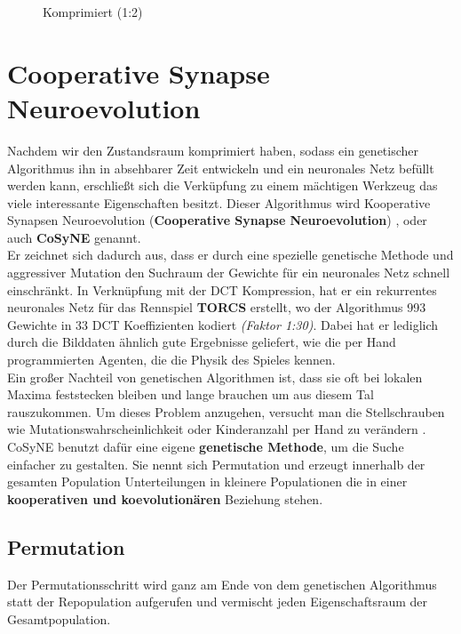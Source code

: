 \begin{multicols}{2}
\begin{figure}[H]
\begin{center}
                        \caption{Komprimiert (1:2)}\label{fig:dct-after}
                    \end{center}
                \end{figure}
            \end{multicols}

\newpage

    \section{Cooperative Synapse Neuroevolution} \label{cosyne-definition}
        Nachdem wir den Zustandsraum komprimiert haben, sodass ein genetischer Algorithmus ihn in absehbarer Zeit entwickeln und ein neuronales Netz befüllt werden kann, erschließt sich die Verküpfung zu einem mächtigen Werkzeug das viele interessante Eigenschaften besitzt. Dieser Algorithmus wird Kooperative Synapsen Neuroevolution (\textbf{Cooperative Synapse Neuroevolution}) \cite{cosyne2}, oder auch \textbf{CoSyNE} genannt.\\

        \noindent
        Er zeichnet sich dadurch aus, dass er durch eine spezielle genetische Methode und aggressiver Mutation den Suchraum der Gewichte für ein neuronales Netz schnell einschränkt. In Verknüpfung mit der DCT Kompression, hat er ein rekurrentes neuronales Netz für das Rennspiel \textbf{TORCS} \cite{cosyne3} erstellt, wo der Algorithmus 993 Gewichte in 33 DCT Koeffizienten kodiert \textit{(Faktor 1:30)}. Dabei hat er lediglich durch die Bilddaten ähnlich gute Ergebnisse geliefert, wie die per Hand programmierten Agenten, die die Physik des Spieles kennen.\\

        \noindent
        Ein großer Nachteil von genetischen Algorithmen ist, dass sie oft bei lokalen Maxima feststecken bleiben und lange brauchen um aus diesem Tal rauszukommen. Um dieses Problem anzugehen, versucht man die Stellschrauben wie Mutationswahrscheinlichkeit oder Kinderanzahl per Hand zu verändern \cite{grefenstette86}. CoSyNE benutzt dafür eine eigene \textbf{genetische Methode}, um die Suche einfacher zu gestalten. Sie nennt sich Permutation und erzeugt innerhalb der gesamten Population Unterteilungen in kleinere Populationen die in einer \textbf{kooperativen und koevolutionären} Beziehung stehen.
        \subsection{Permutation}
            Der Permutationsschritt wird ganz am Ende von dem genetischen Algorithmus statt der Repopulation aufgerufen und vermischt jeden \colorbox{green!25}{Eigenschaftsraum} der Gesamtpopulation. 

